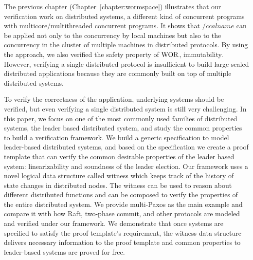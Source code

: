 The previous chapter (Chapter~\ref{chapter:wormspace}) illustrates that our verification work on distributed systems, 
a different kind of concurrent programs with multicore/multithreaded concurrent programs. 
It shows 
that $/ccalname$ can be applied not only to the concurrency by local machines
but also to the concurrency in the cluster of multiple machines in distributed protocols. 
By using the approach, we also verified  the safety property of $\mathrm{WOR}$, immutability. 
However, verifying a single distributed protocol is insufficient to build large-scaled distributed applications 
because they are commonly built on top of multiple distributed systems.

To verify the correctness of the application, underlying
systems should be verified, but even verifying a single distributed system is
still very challenging. In this paper, we focus on one of the most commonly
used families of distributed systems, the leader based distributed system, and study the common properties to build a verification framework.
We build a generic specification to model leader-based distributed systems, and based on
the specification we create a proof template that can verify the common
desirable properties of the leader based system: linearizability and soundness of
the leader election. 
Our framework uses a novel logical data structure called witness which keeps track of the history of state changes in distributed nodes.
The witness can be used to reason about different distributed functions and can
be composed to verify the properties of the entire distributed system. We provide
multi-Paxos as the main example and compare it with
how Raft, two-phase commit, and other protocols are modeled and verified under
our framework. 
We demonstrate that once systems are specified to satisfy the proof template's requirement, the witness data structure delivers necessary
information to the proof template and common properties to leader-based systems are proved for free. 




